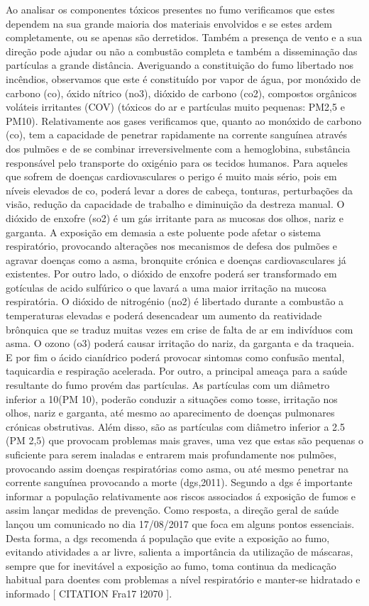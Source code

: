 \documentclass{report}
\begin{document}
Ao analisar os componentes tóxicos presentes no fumo verificamos que estes dependem na sua grande maioria dos materiais envolvidos e se estes ardem completamente, ou se apenas são derretidos. Também a presença de vento e a sua direção pode ajudar ou não a combustão completa e também a disseminação das partículas a grande distância.
 Averiguando a constituição do fumo libertado nos incêndios, observamos que este é constituído por vapor de água, por monóxido de carbono (\ac{co}), óxido nítrico (\ac{no3}), dióxido de carbono (\ac{co2}), compostos orgânicos voláteis irritantes (COV) (tóxicos do ar e partículas muito pequenas: PM2,5 e PM10).
Relativamente aos gases verificamos que, quanto ao monóxido de carbono (\ac{co}), tem a capacidade de penetrar rapidamente na corrente sanguínea através dos pulmões e de se combinar irreversivelmente com a hemoglobina, substância responsável pelo transporte do oxigénio para os tecidos humanos. Para aqueles que sofrem de doenças cardiovasculares o perigo é muito mais sério, pois em níveis elevados de \ac{co}, poderá levar a dores de cabeça, tonturas, perturbações da visão, redução da capacidade de trabalho e diminuição da destreza manual.
O dióxido de enxofre (\ac{so2}) é um gás irritante para as mucosas dos olhos, nariz e garganta. A exposição em demasia a este poluente pode afetar o sistema respiratório, provocando alterações nos mecanismos de defesa dos pulmões e agravar doenças como a asma, bronquite crónica e doenças cardiovasculares já existentes. Por outro lado, o dióxido de enxofre poderá ser transformado em gotículas de acido sulfúrico o que lavará a uma maior irritação na mucosa respiratória.
O dióxido de nitrogénio (\ac{no2}) é libertado durante a combustão a temperaturas elevadas e poderá desencadear um aumento da reatividade brônquica que se traduz muitas vezes em crise de falta de ar em indivíduos com asma. 
O ozono (\ac{o3}) poderá causar irritação do nariz, da garganta e da traqueia. E por fim o ácido cianídrico poderá provocar sintomas como confusão mental, taquicardia e respiração acelerada. 
Por outro, a principal ameaça para a saúde resultante do fumo provém das partículas. As partículas com um diâmetro inferior a 10\micro\meter (PM 10), poderão conduzir a situações como tosse, irritação nos olhos, nariz e garganta, até mesmo ao aparecimento de doenças pulmonares crónicas obstrutivas. Além disso, são as partículas com diâmetro inferior a 2.5 \micro\meter (PM 2,5) que provocam problemas mais graves, uma vez que estas são pequenas o suficiente para serem inaladas e entrarem mais profundamente nos pulmões, provocando assim doenças respiratórias como asma, ou até mesmo penetrar na corrente sanguínea provocando a morte (\ac{dgs},2011).
Segundo a \ac{dgs} é importante informar a população relativamente aos riscos associados á exposição de fumos e assim lançar medidas de prevenção. Como resposta, a direção geral de saúde lançou um comunicado no dia 17/08/2017 que foca em alguns pontos essenciais. Desta forma, a \ac{dgs} recomenda á população que evite a exposição ao fumo, evitando atividades a ar livre, salienta a importância da utilização de máscaras, sempre que for inevitável a exposição ao fumo, toma continua da medicação habitual para doentes com problemas a nível respiratório e manter-se hidratado e informado [ CITATION Fra17 \l 2070 ].
\end{document}

